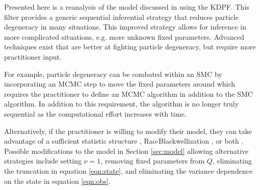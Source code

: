 
Presented here is a reanalysis of the model discussed in \citet{skvortsov2012monitoring} using the KDPF. This filter provides a generic sequential inferential strategy that reduces particle degeneracy in many situations. This improved strategy allows for inference in more complicated situations, e.g. more unknown fixed parameters. Advanced techniques exist that are better at fighting particle degeneracy, but require more practitioner input.

For example, particle degeneracy can be combated within an SMC by incorporating an MCMC step to move the fixed parameters around \citep{Gilk:Berz:foll:2001,Stor:part:2002} which requires the practitioner to define an MCMC algorithm in addition to the SMC algorithm. In addition to this requirement, the algorithm is no longer truly sequential as the computational effort increases with time.

Alternatively, if the practitioner is willing to modify their model, they can take advantage of a sufficient statistic structure \citep{Fear:mark:2002}, Rao-Blackwellization \citep{Douc:Gods:Andr:on:2000}, or both \citep{carvalho2010particle}. Possible modifications to the model in Section \ref{sec:model} allowing alternative strategies include setting $\nu=1$, removing fixed parameters from $Q$, eliminating the truncation in equation \eqref{eqn:state}, and eliminating the variance dependence on the state in equation \eqref{eqn:obs}.


